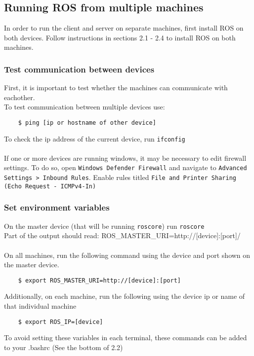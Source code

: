 \documentclass[twoside]{article}
\begin{document}
 	\subsection{Running ROS from multiple machines}
 	In order to run the client and server on separate machines, first install ROS on both devices. Follow instructions in sections 2.1 - 2.4 to install ROS on both machines.
 	
 	\subsubsection{Test communication between devices}
 	First, it is important to test whether the machines can communicate with eachother. \\
 	To test communication between multiple devices use:
 	
 	\begin{verbatim}
 	$ ping [ip or hostname of other device]
 	\end{verbatim}
 	To check the ip address of the current device, run \verb|ifconfig| \\ \\
 	If one or more devices are running windows, it may be necessary to edit firewall settings.
 	To do so, open \verb|Windows Defender Firewall| and navigate to \verb|Advanced Settings > Inbound Rules|. Enable rules titled \verb|File and Printer Sharing (Echo Request - ICMPv4-In)|
 	
 	\subsubsection{Set environment variables}
 	On the master device (that will be running \verb|roscore|) run \verb|roscore| \\
 	Part of the output should read: ROS\_MASTER\_URI=http://[device]:[port]/ \\ \\
 	On all machines, run the following command using the device and port shown on the master device.
 	
 	\begin{verbatim}
 	$ export ROS_MASTER_URI=http://[device]:[port]
 	\end{verbatim}
 	Additionally, on each machine, run the following using the device ip or name of that individual machine
 	
 	\begin{verbatim}
 	$ export ROS_IP=[device]
 	\end{verbatim}
 	To avoid setting these variables in each terminal, these commands can be added to your .bashrc (See the bottom of 2.2)
 	
\end{document}
